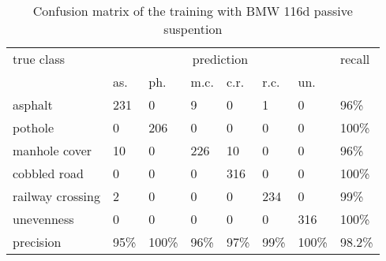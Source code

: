 \begin{table}
\centering
\caption{Confusion matrix of the training with BMW 116d passive suspention}
\label{tbl:fcm_passiv}
\begin{tabular}{llllllll}
\hline
true class & \multicolumn{6}{c}{prediction}  & recall 
 \\
                 & as.  & ph.  & m.c. & c.r. & r.c.  & un.   &     
 \\ \hline
asphalt          & 231  & 0    & 9   & 0    & 1     & 0     & 96\%        \\
pothole          & 0    & 206  & 0    & 0    & 0     & 0     & 100\%        \\
manhole cover    & 10   & 0    & 226  & 10   & 0     & 0     & 96\%        \\
cobbled road     & 0   & 0    & 0    & 316   & 0     & 0     & 100\%        \\
railway crossing & 2    & 0    & 0    & 0    & 234   & 0     & 99\%       \\
unevenness       & 0    & 0    & 0    & 0    & 0     & 316   & 100\%       \\ \hline
precision        & 95\% & 100\% & 96\% & 97\% & 99\% & 100\% & 98.2\%   
 \\ \hline
\end{tabular}
\end{table}



